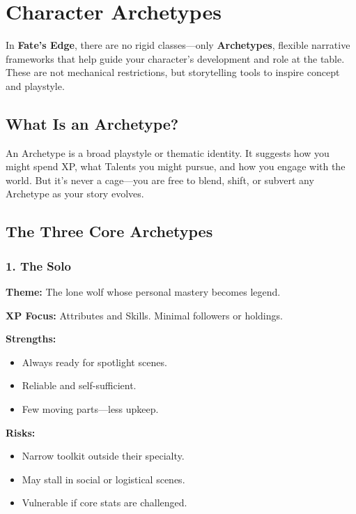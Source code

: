 
\chapter{Character Archetypes}

In \textbf{Fate’s Edge}, there are no rigid classes—only \textbf{Archetypes}, flexible narrative frameworks that help guide your character’s development and role at the table. These are not mechanical restrictions, but storytelling tools to inspire concept and playstyle.

\section{What Is an Archetype?}

An Archetype is a broad playstyle or thematic identity. It suggests how you might spend XP, what Talents you might pursue, and how you engage with the world. But it’s never a cage—you are free to blend, shift, or subvert any Archetype as your story evolves.

\section{The Three Core Archetypes}

\subsection*{1. The Solo}

\textbf{Theme:} The lone wolf whose personal mastery becomes legend.

\textbf{XP Focus:} Attributes and Skills. Minimal followers or holdings.

\textbf{Strengths:}
\begin{itemize}
  \item Always ready for spotlight scenes.
  \item Reliable and self-sufficient.
  \item Few moving parts—less upkeep.
\end{itemize}

\textbf{Risks:}
\begin{itemize}
  \item Narrow toolkit outside their specialty.
  \item May stall in social or logistical scenes.
  \item Vulnerable if core stats are challenged.
\end{itemize}

